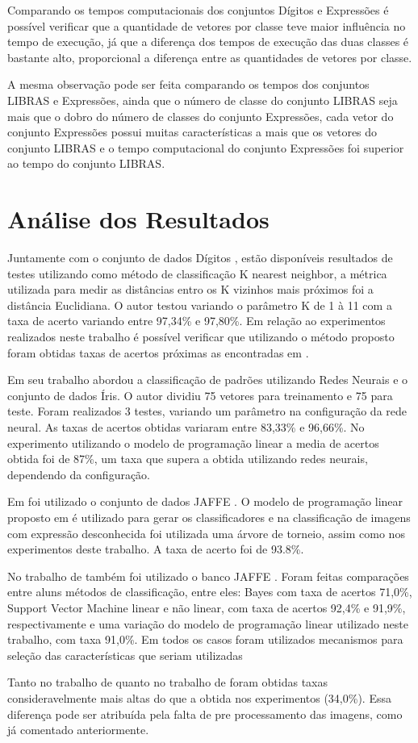 Comparando os tempos computacionais dos conjuntos Dígitos e Expressões é possível verificar que a quantidade de vetores por classe teve maior influência no tempo de execução, já que a diferença dos tempos de execução das duas classes é bastante alto, proporcional a diferença entre as quantidades de vetores por classe. 

A mesma observação pode ser feita comparando os tempos dos conjuntos LIBRAS e Expressões, ainda que o número de classe do conjunto LIBRAS seja mais que o dobro do número de classes do conjunto Expressões, cada vetor do conjunto Expressões possui muitas características a mais que os vetores do conjunto LIBRAS e o tempo computacional do conjunto Expressões foi superior ao tempo do conjunto LIBRAS.

\section{Análise dos Resultados}

Juntamente com o conjunto de dados Dígitos \cite{Digitos}, estão disponíveis resultados de testes utilizando como método de classificação K nearest neighbor, a métrica utilizada para medir as distâncias entro os K vizinhos mais próximos foi a distância Euclidiana. O autor testou variando o parâmetro K de 1 à 11 com a taxa de acerto variando entre 97,34\% e 97,80\%. Em relação ao experimentos realizados neste trabalho é possível verificar que utilizando o método proposto foram obtidas taxas de acertos próximas as encontradas em .

Em seu trabalho  abordou a classificação de padrões utilizando Redes Neurais e o conjunto de dados Íris. O autor dividiu 75 vetores para treinamento e 75 para teste. Foram realizados 3 testes, variando um parâmetro na configuração da rede neural. As taxas de acertos obtidas variaram entre 83,33\% e 96,66\%. No experimento utilizando o modelo de programação linear a media de acertos obtida foi de 87\%, um taxa que supera a obtida utilizando redes neurais, dependendo da configuração.

Em  foi utilizado o conjunto de dados JAFFE \cite{Jaffe}. O modelo de programação linear proposto em  é utilizado para gerar os classificadores e na classificação de imagens com expressão desconhecida foi utilizada uma árvore de torneio, assim como nos experimentos deste trabalho. A taxa de acerto foi de 93.8\%.

No trabalho de  também foi utilizado o banco JAFFE \cite{Jaffe}. Foram feitas comparações entre aluns métodos de classificação, entre eles: Bayes com taxa de acertos 71,0\%, Support Vector Machine linear e não linear, com taxa de acertos 92,4\% e 91,9\%, respectivamente e uma variação do modelo de programação linear utilizado neste trabalho, com taxa 91,0\%. Em todos os casos foram utilizados mecanismos para seleção das características que seriam utilizadas
 
Tanto no trabalho de  quanto no trabalho de  foram obtidas taxas consideravelmente mais altas do que a obtida nos experimentos (34,0\%). Essa diferença pode ser atribuída pela falta de pre processamento das imagens, como já comentado anteriormente.


